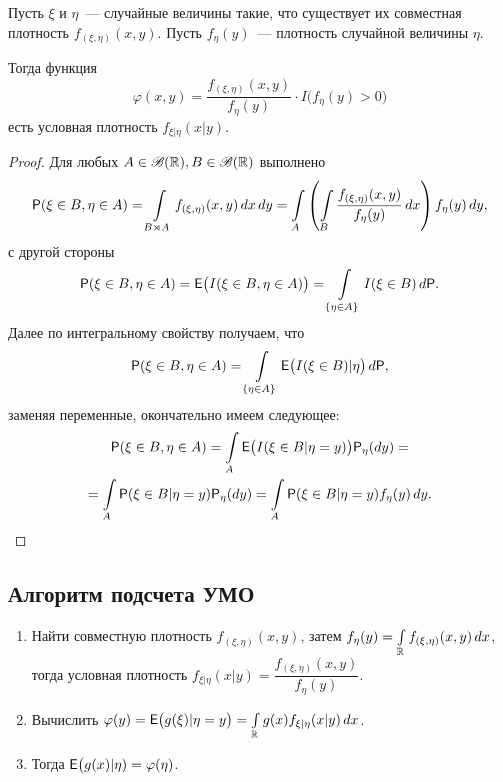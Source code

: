  \begin{theorem}
 	Пусть $\xi$ и $\eta$~--- случайные величины такие, что существует их совместная плотность $f_{(\xi, \eta)} (x, y)$. Пусть $f_\eta (y)$~--- плотность случайной величины $\eta$.
 	
 	Тогда функция $$\varphi(x, y) = \dfrac{f_{(\xi, \eta)} (x, y)}{f_\eta (y)} \cdot I \big(f_\eta(y) > 0 \big)$$ есть условная плотность $f_{\xi |\eta} (x | y)$.
 	\begin{proof}
 		Для любых $A \in \B(\R), B \in \B(\R)$ выполнено
 		\begin{multline*}
 			\P(\xi \in B, \eta \in A) = 
 			\int\limits_{B \rtimes A} f_{(\xi, \eta)} (x, y) \, dx \, dy = 
 			\int\limits_A \left( \int\limits_B \dfrac{f_{(\xi, \eta)} 
 			(x, y)}{f_\eta(y)} \, dx \right) f_\eta(y) \, dy,
 		\end{multline*}
 		с другой стороны
 		\begin{equation*}
 			\P( \xi \in B, \eta \in A) = \E \big( I (\xi \in B, \eta \in A) \big) = 
 			\int\limits_{\{\eta \in A \}} I(\xi \in B) \, d\P.
 		\end{equation*}
 		Далее по интегральному свойству получаем, что
 		\begin{equation*}
 			\P( \xi \in B, \eta \in A) = 
 			\int\limits_{\{\eta \in A \}} \E  \big( I(\xi \in B) | \eta \big) \, d\P,
 		\end{equation*}
 		заменяя переменные, окончательно имеем следующее:
 		\begin{multline*}
 			\P( \xi \in B, \eta \in A) = 
 			\int\limits_A \E \big( I (\xi \in B | \eta = y) \big) \P_\eta(d y) =\\ 
 			= \int\limits_A \P(\xi \in B | \eta = y) \P_\eta(dy) = 
 			\int\limits_A \P( \xi \in B | \eta = y) f_\eta (y) \, dy.
 		\end{multline*}
 	\end{proof}
 \end{theorem}
 
 \subsection{Алгоритм подсчета УМО}
 \begin{enumerate}
 	\item {Найти совместную плотность $f_{(\xi, \eta)} (x, y)$, затем 
 		$f_\eta (y) = \int\limits_\R f_{(\xi, \eta)} (x, y) \, dx$, тогда условная плотность $f_{ \xi | \eta } (x | y) = \dfrac{f_{(\xi, \eta)} (x, y)}{f_\eta (y)}$.}
 	\item {Вычислить $\varphi(y) = \E \big( g(\xi) | \eta = y \big) = \int\limits_\R g(x) f_{ \xi | \eta } (x | y) \, dx $.}
 	\item {Тогда $\E  \big( g(x) | \eta) = \varphi(\eta)$.}
 \end{enumerate}
 